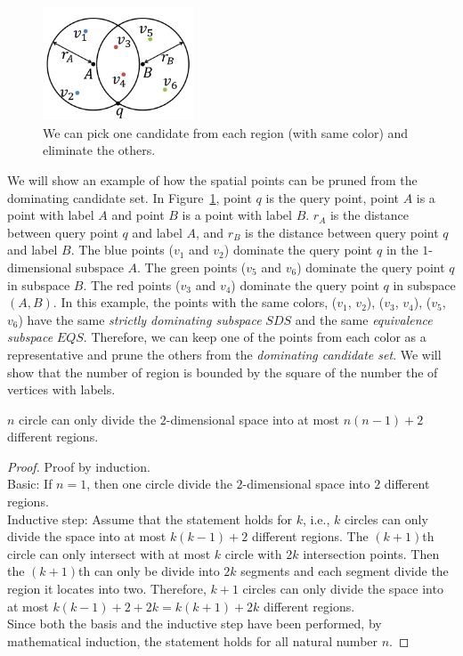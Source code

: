 \begin{figure}[h]
    \centering
      \includegraphics[width=0.4\textwidth]{figs/Circle_Spatial_Example}
    \caption{We can pick one candidate from each region (with same color) and eliminate the others.}
    \label{fig:circle_example}
\end{figure}

We will show an example of how the spatial points can be pruned from the dominating candidate set. In Figure~\ref{fig:circle_example}, point $q$ is the query point, point $A$ is a point with label $A$ and point $B$ is a point with label $B$. $r_{A}$ is the distance between query point $q$ and label $A$, and $r_{B}$ is the distance between query point $q$ and label $B$. The blue points ($v_1$ and $v_2$) dominate the query point $q$ in the $1$-dimensional subspace $A$. The green points ($v_5$ and $v_6$) dominate the query point $q$ in subspace $B$. The red points ($v_3$ and $v_4$) dominate the query point $q$ in subspace $(A, B)$. In this example, the points with the same colors, ($v_1$, $v_2$), ($v_3$, $v_4$), ($v_5$, $v_6$) have the same \emph{strictly dominating subspace} $\mathit{SDS}$ and the same \emph{equivalence subspace} $\mathit{EQS}$. Therefore, we can keep one of the points from each color as a representative and prune the others from the \emph{dominating candidate set}. We will show that the number of region is bounded by the square of the number the of vertices with labels.

\begin{property}
\label{ppt:circle_space}
$n$ circle can only divide the $2$-dimensional space into at most $n(n-1)+2$ different regions.
\end{property}

\begin{proof}
Proof by induction.\\
Basic: If $n=1$, then one circle divide the $2$-dimensional space into $2$ different regions.\\
Inductive step: Assume that the statement holds for $k$, i.e., $k$ circles can only divide the space into at most $k(k-1)+2$ different regions. The $(k+1)$th circle can only intersect with at most $k$ circle with $2k$ intersection points. Then the $(k+1)$th can only be divide into $2k$ segments and each segment divide the region it locates into two. Therefore, $k+1$ circles can only divide the space into at most $k(k-1)+2+2k = k(k+1)+2k$ different regions.\\
Since both the basis and the inductive step have been performed, by mathematical induction, the statement holds for all natural number $n$.
\end{proof}

